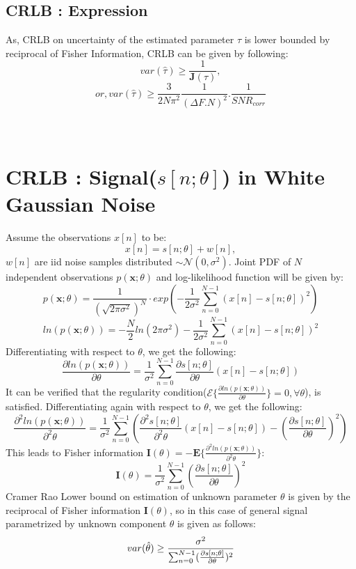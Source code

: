 \documentclass{article}
\begin{document}
\subsection{CRLB : Expression}
As, CRLB on uncertainty of the estimated parameter $\tau$ is lower bounded by reciprocal of Fisher Information, CRLB can be given by following:
$$var(\hat{\tau}) \ge \frac{1}{\mathbf J(\tau)},$$
$$or, var(\hat{\tau}) \ge \frac{3}{2N\pi^2}\frac{1}{(\Delta F.N)^2}.\frac{1}{SNR_{corr}}$$

\appendix
\section{\\CRLB : Signal($s[n;\theta]$) in White Gaussian Noise}
Assume the observations $x[n]$ to be:
$$x[n] = s[n;\theta] + w[n],$$
$w[n]$ are iid noise samples distributed $\sim \mathcal{N}(0, \sigma^2)$. Joint PDF of $N$ independent observations $p(\mathbf x; \theta)$ and log-likelihood function will be given by:
$$p(\mathbf x; \theta) = \frac{1}{(\sqrt{2\pi \sigma^2})^N} \cdot exp(-\frac{1}{2\sigma^2}\sum^{N-1}_{n=0}(x[n] - s[n;\theta])^2)$$
$$ln(p(\mathbf x;\theta)) = -\frac{N}{2}ln(2\pi \sigma^2) - \frac{1}{2\sigma^2}\sum^{N-1}_{n=0}(x[n] - s[n;\theta])^2$$
Differentiating with respect to $\theta$, we get the following:
$$\frac{\partial ln(p(\mathbf x; \theta))}{\partial \theta} = \frac{1}{\sigma^2}\sum^{N-1}_{n=0}\frac{\partial s[n;\theta]}{\partial \theta}(x[n] - s[n;\theta])$$
It can be verified that the regularity condition($\mathcal{E}\{ \frac{\partial ln(p(\mathbf x; \theta))}{\partial \theta} \} = 0, \forall \theta$), is satisfied. Differentiating again with respect to $\theta$, we get the following:
$$\frac{\partial ^2 ln(p(\mathbf x; \theta))}{\partial ^2 \theta} = \frac{1}{\sigma^2}\sum^{N-1}_{n=0}(\frac{\partial ^2s[n;\theta]}{\partial ^2\theta}(x[n] - s[n;\theta]) - (\frac{\partial s[n;\theta]}{\partial \theta})^2)$$
This leads to Fisher information $\mathbf I (\theta) = -\mathbf E \{ \frac{\partial ^2ln(p(\mathbf x; \theta))}{\partial ^2\theta} \}$:
$$\mathbf I(\theta) = \frac{1}{\sigma^2}\sum^{N-1}_{n=0}(\frac{\partial s[n;\theta]}{\partial \theta} )^2 $$
Cramer Rao Lower bound on estimation of unknown parameter $\theta$ is given by the reciprocal of Fisher information $\mathbf{I}(\theta)$, so in this case of general signal parametrized by unknown component $\theta$ is given as follows:
\begin{equation} \label{eqA}
\large
var(\hat{\theta}) \ge \frac{\sigma^2}{ \sum^{N-1}_{n=0} (\frac{\partial s[n;\theta]}{\partial \theta} )^2}
\end{equation}

\newpage
\nocite{*}


\end{document}
